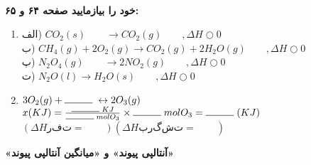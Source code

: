 \documentclass[a4paper,12pt]{article}
\newenvironment{en}
	{\begin{enumerate}\setlength\itemsep{-0.2em}}
	{\end{enumerate}}
\newcommand{\ff}{\rule{1cm}{0.15mm}\;}
\begin{document}
\\
\textbf{خود را بیازمایید صفحه ۶۴ و ۶۵: 	}
\begin{en}
	\item الف) $CO_2(s)\qquad \rightarrow CO_2(g)\qquad, \Delta H \bigcirc 0$
	\\
	ب) $CH_4(g) + 2O_2(g) \rightarrow CO_2(g) + 2H_2O(g)\qquad, \Delta H \bigcirc 0$
	\\
	پ) $N_2O_4(g)\qquad \rightarrow 2NO_2(g)\qquad, \Delta H \bigcirc 0$
	\\
	ت) $N_2O(l) \rightarrow H_2O(s)\qquad, \Delta H \bigcirc 0$
	\item $3O_2(g) + \ff \leftrightarrow 2O_3(g)$
	\\
	$x(KJ) = \frac{\ff KJ}{\ff mol O_3}\times \ff mol O_3 = \ff (KJ)$
	\\
	$(\Delta H رفت = \qquad) (\Delta H برگشت = \qquad)$
\end{en}
\newpage


\begin{center}
	\textbf{«آنتالپی پیوند» و «میانگین آنتالپی پیوند»}
\end{center}
\end{document}
